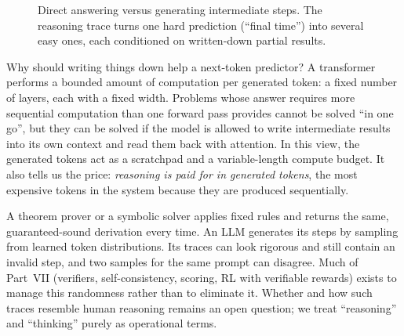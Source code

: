 \begin{figure}[t]
\centering
{}
\caption{Direct answering versus generating intermediate steps. The reasoning trace turns one hard
prediction (``final time'') into several easy ones, each conditioned on written-down partial results.}
\label{fig:landscape:cot}
\end{figure}

Why should writing things down help a next-token predictor? A transformer performs a bounded amount
of computation per generated token: a fixed number of layers, each with a fixed width. Problems whose
answer requires more sequential computation than one forward pass provides cannot be solved
``in one go'', but they can be solved if the model is allowed to write intermediate results into its own
context and read them back with attention. In this view, the generated tokens act as a scratchpad and a
variable-length compute budget. It also tells us the price: \emph{reasoning is paid for in generated
tokens}, the most expensive tokens in the system because they are produced sequentially.

\begin{pitfall}
A theorem prover or a symbolic solver applies fixed rules and returns the same, guaranteed-sound
derivation every time. An LLM generates its steps by sampling from learned token distributions. Its
traces can look rigorous and still contain an invalid step, and two samples for the same prompt can
disagree. Much of Part~VII (verifiers, self-consistency, scoring, RL with verifiable rewards) exists to
manage this randomness rather than to eliminate it. Whether and how such traces resemble human
reasoning remains an open question; we treat ``reasoning'' and ``thinking'' purely as operational terms.
\end{pitfall}

